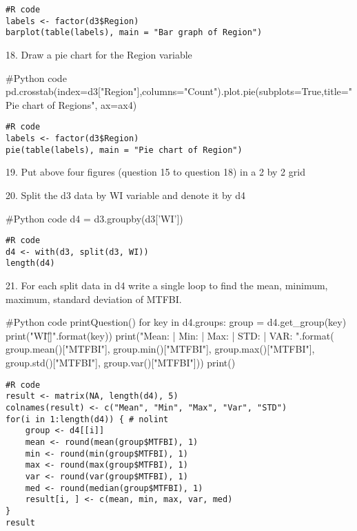 \documentclass{article}
\begin{document}
\begin{verbatim}
#R code
labels <- factor(d3$Region)
barplot(table(labels), main = "Bar graph of Region")

\end{verbatim}

18.	Draw a pie chart for the  Region variable
\begin{pythoncode}
#Python code
pd.crosstab(index=d3["Region"],columns="Count").plot.pie(subplots=True,title="Pie chart of Regions", ax=ax4)
\end{pythoncode}

\begin{verbatim}
#R code
labels <- factor(d3$Region)
pie(table(labels), main = "Pie chart of Region")

\end{verbatim}

19.	Put above four figures (question 15 to question 18) in a 2 by 2 grid


20.	Split the d3 data by WI variable and denote it by d4
\begin{pythoncode}
#Python code
d4 = d3.groupby(d3['WI'])
\end{pythoncode}

\begin{verbatim}
#R code
d4 <- with(d3, split(d3, WI))
length(d4)
\end{verbatim}


21.	For each split data in d4 write a single loop to find the mean, minimum, maximum, standard deviation of MTFBI.
\begin{pythoncode}
#Python code
printQuestion()
for key in d4.groups:
    group = d4.get_group(key)
    print("WI[\"{}\"]".format(key))
    print("Mean: {} | Min: {} | Max: {} | STD: {} | VAR: {}".format(
        group.mean()["MTFBI"],
        group.min()["MTFBI"],
        group.max()["MTFBI"],
        group.std()["MTFBI"],
        group.var()["MTFBI"]))
    print()
\end{pythoncode}

\begin{verbatim}
#R code
result <- matrix(NA, length(d4), 5)
colnames(result) <- c("Mean", "Min", "Max", "Var", "STD")
for(i in 1:length(d4)) { # nolint
    group <- d4[[i]]
    mean <- round(mean(group$MTFBI), 1)
    min <- round(min(group$MTFBI), 1)
    max <- round(max(group$MTFBI), 1)
    var <- round(var(group$MTFBI), 1)
    med <- round(median(group$MTFBI), 1)
    result[i, ] <- c(mean, min, max, var, med)
}
result

\end{verbatim}
\end{document}
